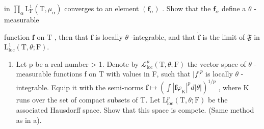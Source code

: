 in \(\prod_{\alpha} \mathrm{L}_{\mathrm{F}}^{1}(\mathrm{T}, \mu_{\alpha})\) converges to an element \((\mathbf{f}_{\alpha})\) . Show that the \(\mathbf{f}_{\alpha}\) define a \(\theta\) -measurable

function \(\mathbf{f}\) on \(\mathrm{T}\) , then that \(\mathbf{f}\) is locally \(\theta\) -integrable, and that \(\dot{\mathbf{f}}\) is the limit of \(\mathfrak{F}\) in \(\mathrm{L}_{\mathrm{loc}}^{1}(\mathrm{T},\theta ;\mathrm{F}).\)

\begin{enumerate}
\def\labelenumi{\alph{enumi})}
\setcounter{enumi}{1}
\tightlist
\item
  Let p be a real number \textgreater{} 1. Denote by \(\mathcal{L}_{\mathrm{loc}}^{p}(\mathrm{T},\theta;\mathrm{F})\) the vector space of \(\theta\) -measurable functions f on T with values in F, such that \(|f|^{p}\) is locally \(\theta\) -integrable. Equip it with the semi-norms \(\mathbf{f} \mapsto (\int |\mathbf{f}\varphi_{\mathrm{K}}|^{p}d|\theta|)^{1/p}\) , where K runs over the set of compact subsets of T. Let \(\mathrm{L}_{\mathrm{loc}}^{p}(\mathrm{T},\theta;\mathrm{F})\) be the associated Hausdorff space. Show that this space is compete. (Same method as in a).
\end{enumerate}

\setcounter{exercisegroup}{6}
\edef\CurrentExerciseGroup{\arabic{exercisegroup}}
